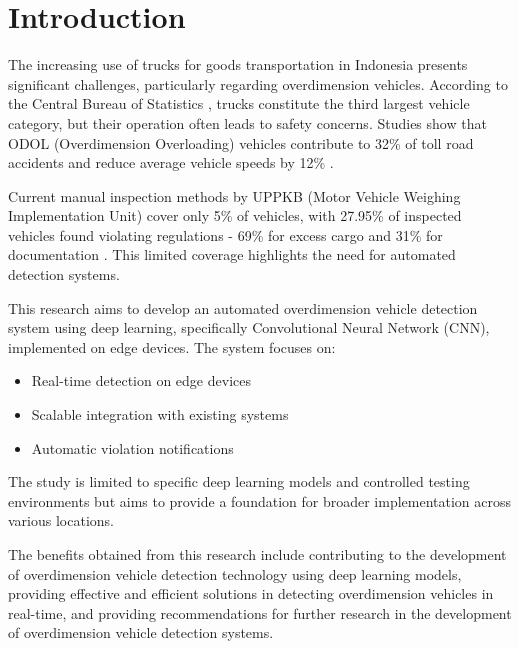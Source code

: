 \section{Introduction}
\label{sec:introduction}

The increasing use of trucks for goods transportation in Indonesia presents significant challenges, particularly regarding overdimension vehicles. According to the Central Bureau of Statistics \cite{bps2023}, trucks constitute the third largest vehicle category, but their operation often leads to safety concerns. Studies show that ODOL (Overdimension Overloading) vehicles contribute to 32\% of toll road accidents and reduce average vehicle speeds by 12\% \cite{odol2020}.

Current manual inspection methods by UPPKB (Motor Vehicle Weighing Implementation Unit) cover only 5\% of vehicles, with 27.95\% of inspected vehicles found violating regulations - 69\% for excess cargo and 31\% for documentation \cite{hubdat2024}. This limited coverage highlights the need for automated detection systems.

This research aims to develop an automated overdimension vehicle detection system using deep learning, specifically Convolutional Neural Network (CNN), implemented on edge devices. The system focuses on:
\begin{itemize}
  \item Real-time detection on edge devices
  \item Scalable integration with existing systems
  \item Automatic violation notifications
\end{itemize}

The study is limited to specific deep learning models and controlled testing environments but aims to provide a foundation for broader implementation across various locations.

The benefits obtained from this research include contributing to the development of overdimension vehicle detection technology using deep learning models, providing effective and efficient solutions in detecting overdimension vehicles in real-time, and providing recommendations for further research in the development of overdimension vehicle detection systems.